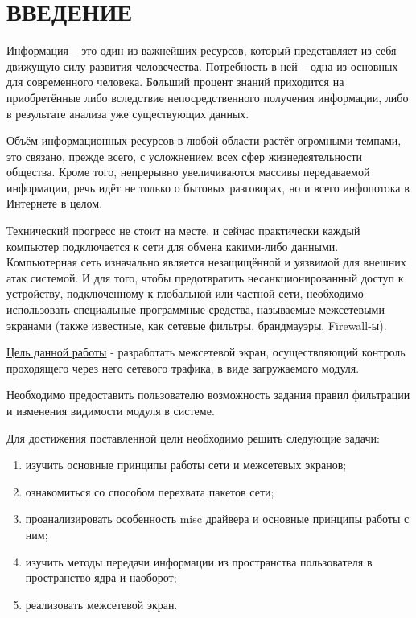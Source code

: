 \section*{ВВЕДЕНИЕ}

Информация -- это один из важнейших ресурсов, который представляет из себя движущую силу развития человечества. Потребность в ней -- одна из основных для современного человека. Б\textbf{о}льший процент знаний приходится на приобретённые либо вследствие непосредственного получения информации, либо в результате анализа уже существующих данных. 

Объём информационных ресурсов в любой области растёт огромными темпами, это связано, прежде всего, с усложнением всех сфер жизнедеятельности общества. Кроме того, непрерывно увеличиваются массивы передаваемой информации, речь идёт не только о бытовых разговорах, но и всего инфопотока в Интернете в целом. 

Технический прогресс не стоит на месте, и сейчас практически каждый компьютер подключается к сети для обмена какими-либо данными. Компьютерная сеть изначально является незащищённой и уязвимой для внешних атак системой. И для того, чтобы предотвратить несанкционированный доступ к устройству, подключенному к глобальной или частной сети, необходимо использовать специальные программные средства, называемые межсетевыми экранами (также известные, как сетевые фильтры, брандмауэры, Firewall-ы).

\underline{Цель данной работы} - разработать межсетевой экран, осуществляющий контроль проходящего через него сетевого трафика, в виде загружаемого модуля.

Необходимо предоставить пользователю возможность задания правил фильтрации и изменения видимости модуля в системе.

Для достижения поставленной цели необходимо решить следующие задачи:
\begin{enumerate}
	\item изучить основные принципы работы сети и межсетевых экранов;
	
	\item ознакомиться со способом перехвата пакетов сети;
	
	\item проанализировать особенность misc драйвера и основные принципы работы с ним;
	
	\item изучить методы передачи информации из пространства пользователя в пространство ядра и наоборот;
	
	\item реализовать межсетевой экран.
\end{enumerate}
